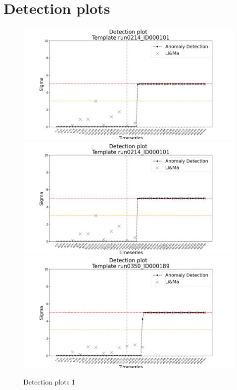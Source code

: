 \section{Detection plots}
\label{s:appendix-detection-plots}


\begin{figure}[!htb]
    
    \includegraphics[width=1\textwidth]{figures/experiments/detection_plots/detection_plot_run0214_ID000101_testset_e.png}\hfill
    \\[\smallskipamount]
    
    \includegraphics[width=1\textwidth]{figures/experiments/detection_plots/detection_plot_run0214_ID000101_testset_e.png}\hfill
    \\[\smallskipamount]

    \includegraphics[width=1\textwidth]{figures/experiments/detection_plots/detection_plot_run0350_ID000189_testset_e.png}\hfill
    \\[\smallskipamount]

    \caption{Detection plots 1}\label{fig:detection-plots-1}
\end{figure}


